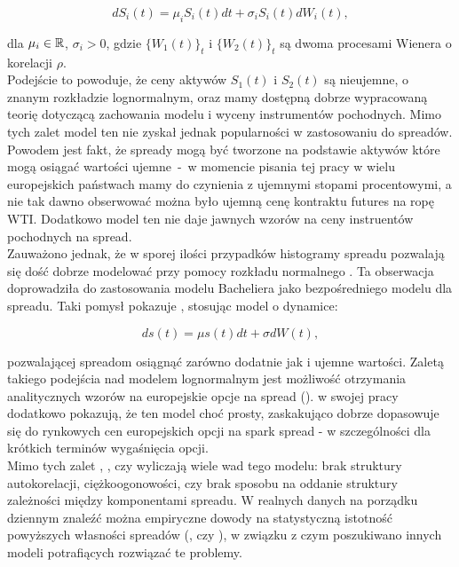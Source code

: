 $$ dS_i(t) = \mu_i S_i(t)dt + \sigma_i S_i(t)dW_i(t),$$

dla $\mu_i \in \mathbb{R}$, $\sigma_i >0$, gdzie $\{W_1(t)\}_t$ i $\{W_2(t)\}_t$ są dwoma procesami Wienera o korelacji $\rho$.\\

Podejście to powoduje, że ceny aktywów $S_1(t)$ i $S_2(t)$ są nieujemne, o znanym rozkładzie lognormalnym, oraz mamy dostępną dobrze wypracowaną teorię dotyczącą zachowania modelu i wyceny instrumentów pochodnych. Mimo tych zalet model ten nie zyskał jednak popularności w zastosowaniu do spreadów. Powodem jest fakt, że spready mogą być tworzone na podstawie aktywów które mogą osiągać wartości ujemne~-~w momencie pisania tej pracy w wielu europejskich państwach mamy do czynienia z ujemnymi stopami procentowymi, a nie tak dawno obserwować można było ujemną cenę kontraktu futures na ropę WTI. Dodatkowo model ten nie daje jawnych wzorów na ceny instruentów pochodnych na spread. \\
Zauważono jednak, że w sporej ilości przypadków histogramy spreadu pozwalają się dość dobrze modelować przy pomocy rozkładu normalnego \cite{Carmona_Spread_Options}. Ta obserwacja doprowadziła do zastosowania modelu Bacheliera jako bezpośredniego modelu dla spreadu. Taki pomysł pokazuje \cite{Poitras_Spread_Options_Arithmetic}, stosując model o dynamice:

$$ ds(t) = \mu s(t) dt + \sigma dW(t),$$

pozwalającej spreadom osiągnąć zarówno dodatnie jak i ujemne wartości. Zaletą takiego podejścia nad modelem lognormalnym jest możliwość otrzymania analitycznych wzorów na europejskie opcje na spread (\cite{Poitras_Spread_Options_Arithmetic}). \cite{Carmona_Spread_Options} w swojej pracy dodatkowo pokazują, że ten model choć prosty, zaskakująco dobrze  dopasowuje się do rynkowych cen europejskich opcji na spark spread - w szczególności dla krótkich terminów wygaśnięcia opcji.\\
Mimo tych zalet \cite{Herath_Copula_Crack_Spread}, \cite{Carmona_Spread_Options}, czy \cite{Kim_NonNormal_Spread} wyliczają wiele wad tego modelu: brak struktury autokorelacji, ciężkoogonowości, czy brak sposobu na oddanie struktury zależności między komponentami spreadu. W realnych danych na porządku dziennym znaleźć można empiryczne dowody na statystyczną istotność powyższych własności spreadów (\cite{Kim_NonNormal_Spread}, czy \cite{Schwartz_Ornstein}), w związku z czym poszukiwano innych modeli potrafiących rozwiązać te problemy.

